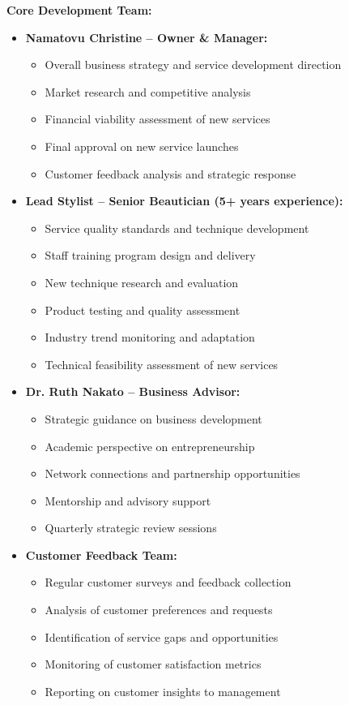 \documentclass[a4paper,12pt]{article}
\begin{document}
\textbf{Core Development Team:}
\begin{itemize}[leftmargin=2em]
    \item \textbf{Namatovu Christine -- Owner \& Manager:}
    \begin{itemize}
        \item Overall business strategy and service development direction
        \item Market research and competitive analysis
        \item Financial viability assessment of new services
        \item Final approval on new service launches
        \item Customer feedback analysis and strategic response
    \end{itemize}
    
    \item \textbf{Lead Stylist -- Senior Beautician (5+ years experience):}
    \begin{itemize}
        \item Service quality standards and technique development
        \item Staff training program design and delivery
        \item New technique research and evaluation
        \item Product testing and quality assessment
        \item Industry trend monitoring and adaptation
        \item Technical feasibility assessment of new services
    \end{itemize}
    
    \item \textbf{Dr. Ruth Nakato -- Business Advisor:}
    \begin{itemize}
        \item Strategic guidance on business development
        \item Academic perspective on entrepreneurship
        \item Network connections and partnership opportunities
        \item Mentorship and advisory support
        \item Quarterly strategic review sessions
    \end{itemize}
    
    \item \textbf{Customer Feedback Team:}
    \begin{itemize}
        \item Regular customer surveys and feedback collection
        \item Analysis of customer preferences and requests
        \item Identification of service gaps and opportunities
        \item Monitoring of customer satisfaction metrics
        \item Reporting on customer insights to management
    \end{itemize}
    

\end{itemize}
\end{document}
